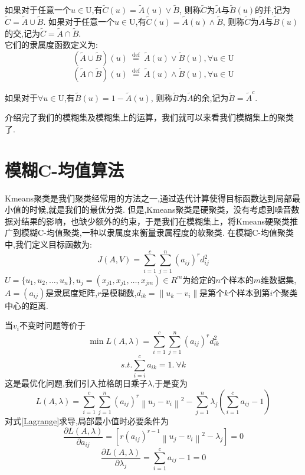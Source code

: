 \begin{definition}
    如果对于任意一个$u \in \mathrm{U}$,有$\tilde{C}(u)=\tilde{A}(u) \vee \tilde{B}$,
    则称$\tilde{C}$为$\tilde{A}$与$\tilde{B}(u)$的并,记为$\tilde{C}=\tilde{A} \cup \tilde{B}$.
    如果对于任意一个$u \in \mathrm{U}$,有$\tilde{C}(u)=\tilde{A}(u) \wedge \tilde{B}$,
    则称$\tilde{C}$为$\tilde{A}$与$\tilde{B}(u)$的交,记为$\tilde{C}=\tilde{A} \cap \tilde{B}$.\\
    它们的隶属度函数定义为:
    \[
        (\tilde{A}\cup  \tilde{B})(u) \stackrel{\text { def }}{=}\tilde{A}(u) \vee \tilde{B}(u) , \forall u \in \mathrm{U}
    \]
    \[
        (\tilde{A}\cap   \tilde{B})(u) \stackrel{\text { def }}{=}\tilde{A}(u) \wedge \tilde{B}(u) ,\forall u \in \mathrm{U}
    \]
\end{definition}
\begin{definition}
    如果对于$\forall u \in \mathrm{U}$,有$\tilde{B}(u)=1-\tilde{A}(u) $,
    则称$\tilde{B}$为$\tilde{A}$的余,记为$\tilde{B}=\tilde{A}^c$.
\end{definition}
介绍完了我们的模糊集及模糊集上的运算，我们就可以来看我们模糊集上的聚类了.
\section{模糊C-均值算法}
Kmeans聚类是我们聚类经常用的方法之一,通过迭代计算使得目标函数达到局部最小值的时候,就是我们的最优分类.
但是,Kmeans聚类是硬聚类，没有考虑到噪音数据对结果的影响，也缺少额外的约束，于是我们在模糊集上，将Kmeans硬聚类推广到模糊C-均值聚类,一种以隶属度来衡量隶属程度的软聚类.
在模糊C-均值聚类中,我们定义目标函数为:
\begin{equation}
    J(A, V)=\sum_{i=1}^{c} \sum_{j=1}^{n}\left(a_{i j}\right)^{r} d_{i j}^2
\end{equation}
$U=\{u_1,u_2,\dots,u_n\},u_j=(x_{j1},x_{j1},\dots,x_{jm})\in R^m$为给定的$n$个样本的$m$维数据集,
$A=(a_{i j})$是隶属度矩阵,$r$是模糊数,$d_{i k}=\| u_k-v_i\|$是第个$k$个样本到第$i$个聚类中心的距离.
\par
当$v_i$不变时问题等价于
\begin{equation}
    \min L(A, \lambda)=\sum_{i=1}^{c} \sum_{j=1}^{n}\left(a_{i j}\right)^{r}d_{i k}^2
\end{equation}
\begin{equation}
    s.t.  \sum_{i=i}^c a_{i k}=1.\  \forall k
\end{equation}
这是最优化问题,我们引入拉格朗日乘子$\lambda$,于是变为
\begin{equation}
    L(A, \lambda)=\sum_{i=1}^{c} \sum_{j=1}^{n}\left(a_{i j}\right)^{r}\left\|u_{j}-v_{i}\right\|^{2}-\sum_{j=1}^{n} \lambda_{j}\left(\sum_{i=1}^{c} a_{i j}-1\right)
    \label{Lagrange}
\end{equation}
对式\ref{Lagrange}求导,局部最小值时必要条件为
\begin{equation}
    \frac{\partial L(A, \lambda)}{\partial a_{i j}}=\left[r\left(a_{i j}\right)^{r-1}\left\|u_{j}-v_{i}\right\|^{2}-\lambda_{j}\right]=0
    \label{dLdAij}
\end{equation}
\begin{equation}
    \frac{\partial L(A, \lambda)}{\partial \lambda_{j}}=\sum_{i=1}^{c} a_{i j}-1=0
    \label{dLdLamda}
\end{equation}


